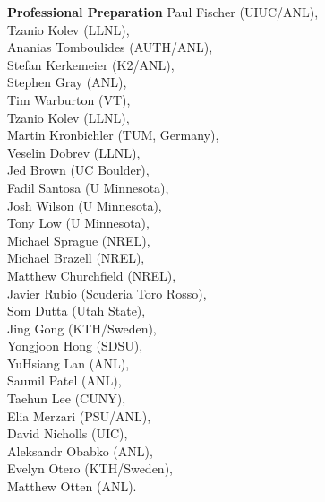 \documentclass[11pt,letterpaper,english]{article}
\begin{document}
\begin{flushleft} {\bf Professional Preparation}
{Paul Fischer (UIUC/ANL),\\
Tzanio Kolev (LLNL), \\
Ananias Tomboulides (AUTH/ANL),\\
Stefan Kerkemeier (K2/ANL),\\
Stephen Gray (ANL),\\
Tim Warburton (VT), \\
Tzanio Kolev (LLNL), \\
Martin Kronbichler (TUM, Germany), \\
Veselin Dobrev (LLNL), \\
Jed Brown (UC Boulder), \\
Fadil Santosa (U Minnesota), \\
Josh Wilson (U Minnesota), \\
Tony Low (U Minnesota), \\
Michael Sprague (NREL),\\
Michael Brazell (NREL), \\
Matthew Churchfield (NREL), \\
Javier Rubio (Scuderia Toro Rosso),\\
Som Dutta (Utah State),  \\
Jing Gong (KTH/Sweden), \\
Yongjoon Hong (SDSU), \\
YuHsiang Lan (ANL), \\
Saumil Patel (ANL), \\
Taehun Lee (CUNY), \\
Elia Merzari (PSU/ANL), \\
David Nicholls (UIC), \\
Aleksandr Obabko (ANL), \\
Evelyn Otero (KTH/Sweden), \\
Matthew Otten (ANL). }


\end{flushleft}
\end{document}
